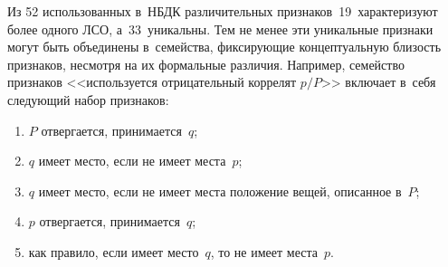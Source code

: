\begin{multicols}{2}
 
  Из 52 использованных в~НБДК различительных при\-зна\-ков~19~характеризуют 
более одного ЛСО, а~33~уникальны. Тем не менее эти уникальные при\-зна\-ки 
могут быть объединены в~семейства, фик\-си\-ру\-ющие концептуальную бли\-зость 
при\-зна\-ков, не\-смот\-ря на их формальные раз\-ли\-чия. Например, семейст\-во 
при\-зна\-ков <<используется отрицательный коррелят $p/P$>> включает в~себя 
сле\-ду\-ющий набор признаков: 
\begin{enumerate}[(1)]
\item %
$P$ отвергается, принимается~$q$; 
\item %
$q$ имеет мес\-то, если не имеет мес\-та~$p$; 
\item %
$q$ имеет мес\-то, если не имеет мес\-та положение вещей, описанное в~$P$; 
\item %
$p$ отвергается, принимается~$q$; 
\item %
как правило, если имеет мес\-то~$q$, то не имеет мес\-та~$p$.
\end{enumerate}
  
\begin{table*}\small %
\vspace*{-3pt}
\begin{center}
\vspace*{2ex}


\end{center}
\end{table*}
\end{multicols}
